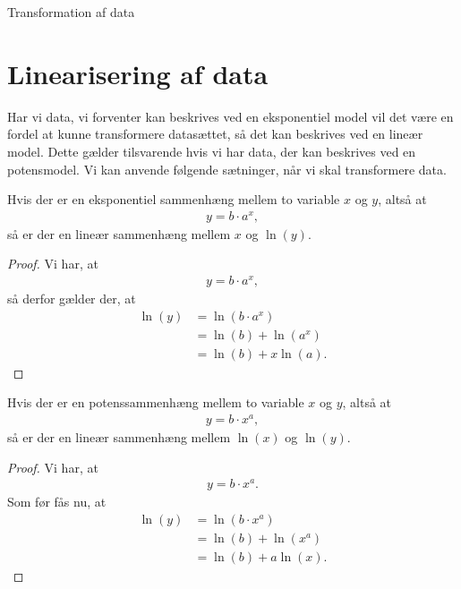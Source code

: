\begin{center}
	\Huge
	Transformation af data
\end{center}
\section*{Linearisering af data}

Har vi data, vi forventer kan beskrives ved en eksponentiel model vil det være en fordel at kunne transformere datasættet, så det kan beskrives ved en lineær model. Dette gælder tilsvarende hvis vi har data, der kan beskrives ved en potensmodel. Vi kan anvende følgende sætninger, når vi skal transformere data.
\begin{setn}
	Hvis der er en eksponentiel sammenhæng mellem to variable $x$ og $y$, altså at
	\begin{align*}
		y = b\cdot a^x,
	\end{align*}
	så er der en lineær sammenhæng mellem $x$ og $\ln(y)$.
\end{setn}
\begin{proof}
	Vi har, at 
	\begin{align*}
		y = b\cdot a^x,
	\end{align*}
	så derfor gælder der, at 
	\begin{align}\label{enkeltlog}
		\ln(y) &= \ln(b\cdot a^x) \nonumber \\
		&= \ln(b) + \ln(a^x)\nonumber \\
		&= \ln(b) + x\ln(a).
	\end{align}
\end{proof}
\begin{setn}
	Hvis der er en potenssammenhæng mellem to variable $x$ og $y$, altså at
	\begin{align*}
		y = b\cdot x^a,
	\end{align*}
	så er der en lineær sammenhæng mellem $\ln(x)$ og $\ln(y)$.
\end{setn}
\begin{proof}
	Vi har, at
	\begin{align*}
		y = b\cdot x^a.
	\end{align*}
	Som før fås nu, at 
	\begin{align*}
		\ln(y) &= \ln(b \cdot x^a)\\
		&= \ln(b) + \ln(x^a)\\
		&= \ln(b) + a\ln(x).
	\end{align*}
\end{proof}

